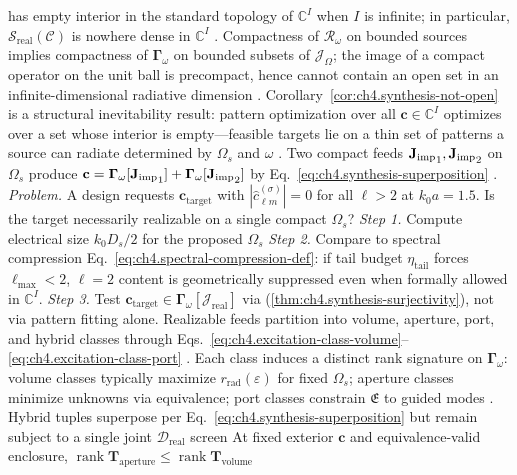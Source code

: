 has empty interior in the standard topology of \(\mathbb{C}^{I}\) when \(I\) is infinite; in particular,
\(\mathcal{S}_{\mathrm{real}}(\mathcal{C})\) is nowhere dense in \(\mathbb{C}^{I}\) \cite{stratton1941}.
Compactness of \(\mathcal{R}_\omega\) on bounded sources implies compactness of
\(\boldsymbol{\Gamma}_\omega\) on bounded subsets of \(\mathcal{J}_\Omega\); the image of a compact operator
on the unit ball is precompact, hence cannot contain an open set in an infinite-dimensional radiative dimension
\cite{harrington2001}.
Corollary~\ref{cor:ch4.synthesis-not-open} is a structural inevitability result: pattern optimization over all
\(\mathbf{c}\in\mathbb{C}^{I}\) optimizes over a set whose interior is empty---feasible targets lie on a thin
set of patterns a source can radiate determined by \(\Omega_{s}\) and \(\omega\) \cite{devaney2004}.
Two compact feeds \({\mathbf{J}_{\mathrm{imp}}}_{1},{\mathbf{J}_{\mathrm{imp}}}_{2}\) on \(\Omega_{s}\) produce
\(\mathbf{c}=\boldsymbol{\Gamma}_\omega[{\mathbf{J}_{\mathrm{imp}}}_{1}]+\boldsymbol{\Gamma}_\omega[{\mathbf{J}_{\mathrm{imp}}}_{2}]\) by
Eq.~\eqref{eq:ch4.synthesis-superposition} \cite{harrington2001}. 
\emph{Problem.} A design requests \(\mathbf{c}_{\mathrm{target}}\) with
\(|\widehat{c}_{\ell m}^{(\sigma)}|=0\) for all \(\ell>2\) at \(k_{0}a=1.5\). Is the target necessarily
realizable on a single compact \(\Omega_{s}\)?
\emph{Step 1.} Compute electrical size \(k_{0}D_{s}/2\) for the proposed \(\Omega_{s}\)
\emph{Step 2.} Compare to spectral compression Eq.~\eqref{eq:ch4.spectral-compression-def}: if tail budget
\(\eta_{\mathrm{tail}}\) forces \(\ell_{\max}<2\), \(\ell=2\) content is geometrically suppressed even when
formally allowed in \(\mathbb{C}^{I}\).
\emph{Step 3.} Test \(\mathbf{c}_{\mathrm{target}}\in\boldsymbol{\Gamma}_\omega[\mathcal{J}_{\mathrm{real}}]\) via
(\ref{thm:ch4.synthesis-surjectivity}), not via pattern fitting alone.
Realizable feeds partition into volume, aperture, port, and hybrid classes through
Eqs.~\eqref{eq:ch4.excitation-class-volume}--\eqref{eq:ch4.excitation-class-port} .
Each class induces a distinct rank signature on \(\boldsymbol{\Gamma}_\omega\): volume classes typically maximize
\(r_{\mathrm{rad}}(\varepsilon)\) for fixed \(\Omega_{s}\); aperture classes minimize unknowns via equivalence;
port classes constrain \(\mathfrak{E}\) to guided modes . Hybrid tuples superpose per Eq.~\eqref{eq:ch4.synthesis-superposition} but remain subject to a single joint \(\mathcal{D}_{\mathrm{real}}\) screen
\label{cor:ch4.excitation-rank-ordering}
At fixed exterior \(\mathbf{c}\) and equivalence-valid enclosure,
\(\operatorname{rank}\mathbf{T}_{\mathrm{aperture}}\le\operatorname{rank}\mathbf{T}_{\mathrm{volume}}\)
